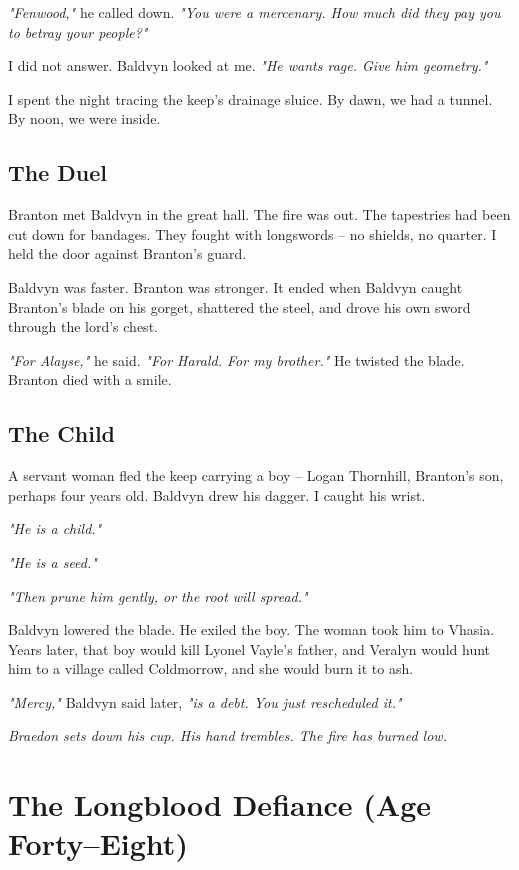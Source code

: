 \documentclass[11pt]{book}
\begin{document}
\emph{"Fenwood,"} he called down. \emph{"You were a mercenary. How much did they pay you to betray your people?"}

I did not answer. Baldvyn looked at me. \textit{"He wants rage. Give him geometry."}

I spent the night tracing the keep's drainage sluice. By dawn, we had a tunnel. By noon, we were inside.

\section*{The Duel}
Branton met Baldvyn in the great hall. The fire was out. The tapestries had been cut down for bandages. They fought with longswords -- no shields, no quarter. I held the door against Branton's guard.

Baldvyn was faster. Branton was stronger. It ended when Baldvyn caught Branton's blade on his gorget, shattered the steel, and drove his own sword through the lord's chest.

\emph{"For Alayse,"} he said. \emph{"For Harald. For my brother."} He twisted the blade. Branton died with a smile.

\section*{The Child}
A servant woman fled the keep carrying a boy -- Logan Thornhill, Branton's son, perhaps four years old. Baldvyn drew his dagger. I caught his wrist.

\emph{"He is a child."}

\emph{"He is a seed."}

\emph{"Then prune him gently, or the root will spread."}

Baldvyn lowered the blade. He exiled the boy. The woman took him to Vhasia. Years later, that boy would kill Lyonel Vayle's father, and Veralyn would hunt him to a village called Coldmorrow, and she would burn it to ash.

\emph{"Mercy,"} Baldvyn said later, \emph{"is a debt. You just rescheduled it."}

\vspace{1em}
\noindent\textit{Braedon sets down his cup. His hand trembles. The fire has burned low.}

\clearpage

\chapter{The Longblood Defiance (Age Forty--Eight)}
\end{document}
